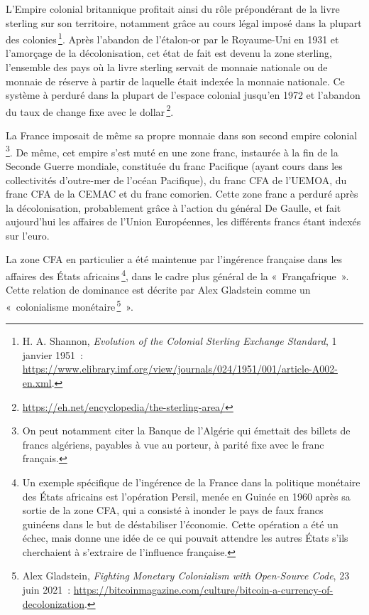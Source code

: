 \documentclass[a4paper,notitlepage]{article}
\newcommand{\eng}[1]{{\NoAutoSpaceBeforeFDP\emph{#1}}}  %
\newcommand{\sfootnote}{\,\footnote}
\begin{document}
L'Empire colonial britannique profitait ainsi du rôle prépondérant de la livre sterling sur son territoire, notamment grâce au cours légal imposé dans la plupart des colonies\sfootnote{H. A. Shannon, \eng{Evolution of the Colonial Sterling Exchange Standard}, 1\ier{} janvier 1951~: \url{https://www.elibrary.imf.org/view/journals/024/1951/001/article-A002-en.xml}.}. Après l'abandon de l'étalon-or par le Royaume-Uni en 1931 et l'amorçage de la décolonisation, cet état de fait est devenu la zone sterling, l'ensemble des pays où la livre sterling servait de monnaie nationale ou de monnaie de réserve à partir de laquelle était indexée la monnaie nationale. Ce système à perduré dans la plupart de l'espace colonial jusqu'en 1972 et l'abandon du taux de change fixe avec le dollar\sfootnote{\url{https://eh.net/encyclopedia/the-sterling-area/}}.

La France imposait de même sa propre monnaie dans son second empire colonial\sfootnote{On peut notamment citer la Banque de l'Algérie qui émettait des billets de francs algériens, payables à vue au porteur, à parité fixe avec le franc français.}. De même, cet empire s'est muté en une zone franc, instaurée à la fin de la Seconde Guerre mondiale, constituée du franc Pacifique (ayant cours dans les collectivités d'outre-mer de l'océan Pacifique), du franc CFA de l'UEMOA, du franc CFA de la CEMAC et du franc comorien. Cette zone franc a perduré après la décolonisation, probablement grâce à l'action du général De Gaulle, et fait aujourd'hui les affaires de l'Union Européennes, les différents francs étant indexés sur l'euro.

La zone CFA en particulier a été maintenue par l'ingérence française dans les affaires des États africains\sfootnote{Un exemple spécifique de l'ingérence de la France dans la politique monétaire des États africains est l'opération Persil, menée en Guinée en 1960 après sa sortie de la zone CFA, qui a consisté à inonder le pays de faux francs guinéens dans le but de déstabiliser l'économie. Cette opération a été un échec, mais donne une idée de ce qui pouvait attendre les autres États s'ils cherchaient à s'extraire de l'influence française.}, dans le cadre plus général de la «~Françafrique~». Cette relation de dominance est décrite par Alex Gladstein comme un «~colonialisme monétaire\sfootnote{Alex Gladstein, \eng{Fighting Monetary Colonialism with Open-Source Code}, 23 juin 2021~: \url{https://bitcoinmagazine.com/culture/bitcoin-a-currency-of-decolonization}.}~». %
\end{document}

